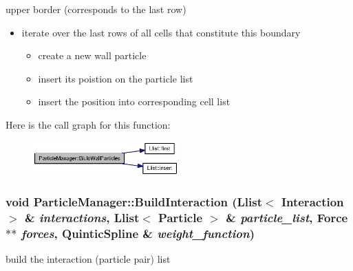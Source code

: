 upper border (corresponds to the last row)

\begin{itemize}
\item iterate over the last rows of all cells that constitute this boundary

\begin{itemize}
\item create a new wall particle

\item insert its poistion on the particle list

\item insert the position into corresponding cell list\end{itemize}
\end{itemize}


Here is the call graph for this function:\nopagebreak
\begin{figure}[H]
\begin{center}
\leavevmode
\includegraphics[width=158pt]{classParticleManager_edebb3e37b06426f6509b35c0926bd59_cgraph}
\end{center}
\end{figure}
\hypertarget{classParticleManager_8cc6658324694ad28d3c50bfc0cbd0f7}{
\subsubsection[{BuildInteraction}]{\setlength{\rightskip}{0pt plus 5cm}void ParticleManager::BuildInteraction ({\bf Llist}$<$ {\bf Interaction} $>$ \& {\em interactions}, \/  {\bf Llist}$<$ {\bf Particle} $>$ \& {\em particle\_\-list}, \/  {\bf Force} $\ast$$\ast$ {\em forces}, \/  {\bf QuinticSpline} \& {\em weight\_\-function})}}
\label{classParticleManager_8cc6658324694ad28d3c50bfc0cbd0f7}


build the interaction (particle pair) list 



